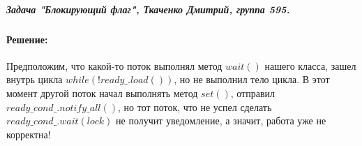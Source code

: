 \documentclass{article}
\begin{document}
\subparagraph{\textit{ Задача "Блокирующий флаг", Ткаченко Дмитрий, группа 595.}}

\paragraph{Решение:} Предположим, что какой-то поток выполнял метод $wait()$ нашего класса, зашел внутрь цикла $while(!ready\_.load())$, но не выполнил тело цикла. В этот момент другой поток начал выполнять метод $set()$, отправил $ready\_cond\_.notify\_all()$, но тот поток, что не успел сделать $ready\_cond\_.wait(lock)$ не получит уведомление, а значит, работа уже не корректна! 
\end{document}
